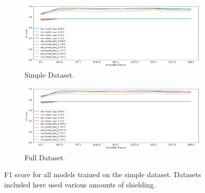 \begin{figure}[H]
     \centering
     \begin{subfigure}[b]{0.9\textwidth}
         \centering
         \includegraphics[width=\textwidth]{images/results_easy_distance_comparison}
         \caption{Simple Dataset.}
         \label{fig:results_easy_distance_comparison_simple}
     \end{subfigure}

     \begin{subfigure}[b]{0.9\textwidth}
         \centering
         \includegraphics[width=\textwidth]{images/results_easy_distance_comparison}
         \caption{Full Dataset.}
         \label{fig:results_easy_distance_comparison_full}
     \end{subfigure}
        \caption{F1 score for all models trained on the simple dataset. Datasets included here used various amounts of shielding.}
        \label{fig:results_easy_distance_comparison}
\end{figure}


